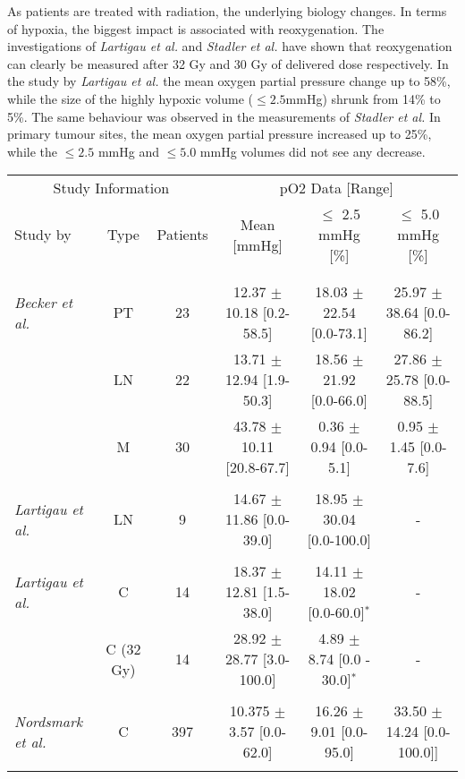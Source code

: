 As patients are treated with radiation, the underlying biology changes. In terms of hypoxia, the biggest impact is associated with reoxygenation. The investigations of \textit{Lartigau et al.}\cite{pmid9797698} and \textit{Stadler et al.}\cite{pmid9783887} have shown that reoxygenation can clearly be measured after 32 Gy and 30 Gy of delivered dose respectively. In the study by \textit{Lartigau et al.} the mean oxygen partial pressure change up to 58\%, while the size of the highly hypoxic volume ($\leq 2.5$mmHg) shrunk from 14\% to 5\%. The same behaviour was observed in the measurements of \textit{Stadler et al.} In primary tumour sites, the mean oxygen partial pressure increased up to 25\%, while the $\leq 2.5$ mmHg and $\leq 5.0$ mmHg volumes did not see any decrease.
\begin{sidewaystable}[p]
\centering
\small
\begin{tabular}{lccccc}
\toprule
\multicolumn{3}{c}{Study Information} & \multicolumn{3}{c}{pO2 Data [Range]}\\
\cmidrule(r){1-3} \cmidrule(r){4-6}
Study by & Type & Patients & Mean [mmHg] & $\leq$ 2.5 mmHg [\%] & $\leq$ 5.0 mmHg [\%]\\\\
\midrule\\
\textit{Becker et al.}\cite{pmid9765692}		& PT & 23 &  12.37 $\pm$ 10.18 [0.2-58.5] & 18.03 $\pm$ 22.54 [0.0-73.1] & 25.97 $\pm$ 38.64 [0.0-86.2]\\
									& LN & 22 &  13.71 $\pm$ 12.94 [1.9-50.3] & 18.56 $\pm$ 21.92 [0.0-66.0] & 27.86 $\pm$ 25.78 [0.0-88.5]\\
									& M & 30 &  43.78 $\pm$ 10.11 [20.8-67.7] & 0.36 $\pm$ 0.94 [0.0-5.1] & 0.95 $\pm$ 1.45 [0.0-7.6]\\\\
\textit{Lartigau et al.}\cite{pmid8453553}		& LN & 9 & 14.67 $\pm$ 11.86 [0.0-39.0] & 18.95 $\pm$ 30.04 [0.0-100.0] & -\\\\
\textit{Lartigau et al.}\cite{pmid9797698}		& C & 14 & 18.37 $\pm$ 12.81 [1.5-38.0] & 14.11 $\pm$ 18.02 [0.0-60.0]$^*$& -\\
									& C (32 Gy) & 14 & 28.92 $\pm$ 28.77 [3.0-100.0] &  4.89 $\pm$ 8.74 [0.0 - 30.0]$^*$& -\\\\
\textit{Nordsmark et al.}\cite{pmid16098619}	& C & 397 & 10.375 $\pm$ 3.57 [0.0-62.0] & 16.26 $\pm$ 9.01 [0.0-95.0] & 33.50 $\pm$ 14.24 [0.0-100.0]]\\\\

\end{tabular}
\end{sidewaystable}
